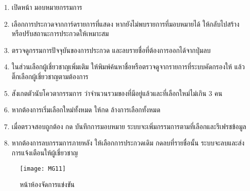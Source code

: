 \begin{sloppypar}
	\begin{enumerate}
		\item เปิดหน้า มอบหมายกรรมการ
		\item เลือกการประกวดจากการ์ดรายการที่แสดง หากยังไม่พบรายการที่มอบหมายได้ ให้กลับไปสร้างหรือปรับสถานะการประกวดให้เหมาะสม
		\item ตรวจดูกรรมการปัจจุบันของการประกวด และลบรายชื่อที่ต้องการออกได้จากปุ่มลบ
		\item ในส่วนเลือกผู้เชี่ยวชาญเพิ่มเติม ให้พิมพ์ค้นหาชื่อหรือตรวจดูจากรายการที่ระบบคัดกรองให้ แล้วติ๊กเลือกผู้เชี่ยวชาญตามต้องการ
		\item สังเกตตัวนับโควตากรรมการ ว่าจำนวนรวมของที่มีอยู่แล้วและที่เลือกใหม่ไม่เกิน 3 คน
		\item หากต้องการเริ่มเลือกใหม่ทั้งหมด ให้กด ล้างการเลือกทั้งหมด
		\item เมื่อตรวจสอบถูกต้อง กด บันทึกการมอบหมาย ระบบจะเพิ่มกรรมการตามที่เลือกและรีเฟรชข้อมูล
		\item หากต้องการลบกรรมการภายหลัง ให้เลือกการประกวดเดิม กดลบที่รายชื่อนั้น ระบบจะลบและส่งการแจ้งเตือนให้ผู้เชี่ยวชาญ
	\end{enumerate}
\end{sloppypar}

\newpage

\vspace{\baselineskip}

\begin{figure}[h]
	\centering
	\texttt{[image: MG11]}
	\caption{หน้าห้องจัดการแข่งขัน}
\end{figure}

\par

